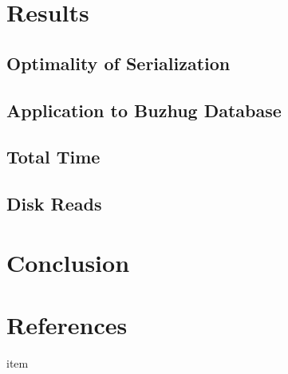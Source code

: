 \documentclass[11pt, oneside]{article}
\begin{document}
\section{Results}

\subsection{Optimality of Serialization}

\subsection{Application to Buzhug Database}


\subsection{Total Time}

\subsection{Disk Reads}

\section{Conclusion}


\section{References}

\noindent

\begin{description}

\item item

\end{description}
\end{document}
